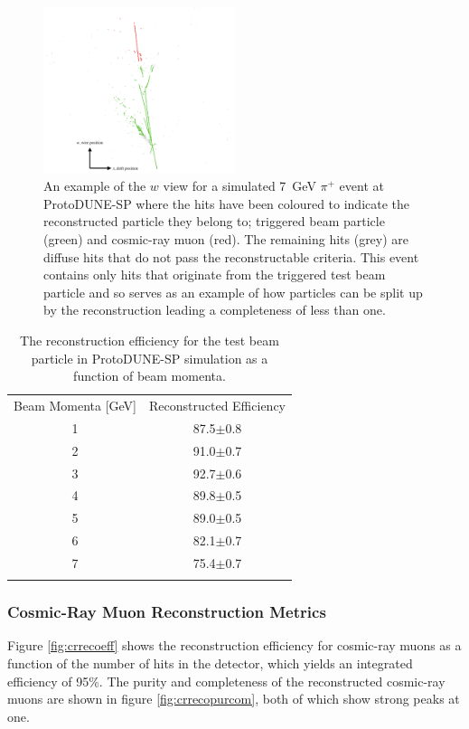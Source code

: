 \begin{figure}
\centering
\includegraphics[width=0.5\textwidth]{Figures/EventDisplays/MC/CompletenessFigure.pdf}
\caption{An example of the $w$ view for a simulated 7~GeV $\pi^{+}$ event at ProtoDUNE-SP where the hits have been coloured to indicate the reconstructed particle they belong to; triggered beam particle (green) and cosmic-ray muon (red).  The remaining hits (grey) are diffuse hits that do not pass the reconstructable criteria.  This event contains only hits that originate from the triggered test beam particle and so serves as an example of how particles can be split up by the reconstruction leading a completeness of less than one.}
\label{fig:completenessfig}
\end{figure}

\begin{table}
\centering
\caption{The reconstruction efficiency for the test beam particle in ProtoDUNE-SP simulation as a function of beam momenta.}
\label{tab:1} 
\begin{tabular}{cc}
\hline\noalign{\smallskip}
Beam Momenta [GeV] & Reconstructed Efficiency  \\
\noalign{\smallskip}\hline\noalign{\smallskip}
1 & 87.5$\pm$0.8 \\
2 & 91.0$\pm$0.7 \\
3 & 92.7$\pm$0.6 \\
4 & 89.8$\pm$0.5 \\
5 & 89.0$\pm$0.5 \\
6 & 82.1$\pm$0.7 \\
7 & 75.4$\pm$0.7 \\
\noalign{\smallskip}\hline
\end{tabular}
\end{table}

\subsubsection{Cosmic-Ray Muon Reconstruction Metrics}
\label{sec:crmetrics}
Figure \ref{fig:crrecoeff} shows the reconstruction efficiency for cosmic-ray muons as a function of the number of hits in the detector, which yields an integrated efficiency of 95\%.  The purity and completeness of the reconstructed cosmic-ray muons are shown in figure \ref{fig:crrecopurcom}, both of which show strong peaks at one.

